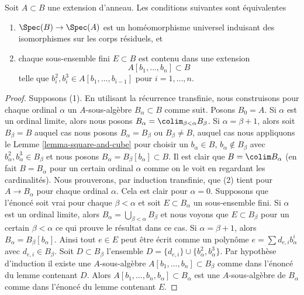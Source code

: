 \begin{proposition}
\label{proposition-universal-homeomorphism-equal-residue-fields}
Soit $A \subset B$ une extension d'anneau. Les conditions suivantes sont équivalentes
\begin{enumerate}
\item $\Spec(B) \to \Spec(A)$ est un homéomorphisme universel induisant des isomorphismes
sur les corps résiduels, et
\item chaque sous-ensemble fini $E \subset B$ est contenu dans une extension
$$
A[b_1, \ldots, b_n] \subset B
$$
telle que $b_i^2, b_i^3 \in A[b_1, \ldots, b_{i - 1}]$ pour $i = 1, \ldots, n$.
\end{enumerate}
\end{proposition}

\begin{proof}
Supposons (1). En utilisant la récurrence transfinie, nous construisons
pour chaque ordinal $\alpha$ un $A$-sous-algèbre $B_\alpha \subset B$
comme suit. Posons $B_0 = A$. Si $\alpha$ est un ordinal limite,
alors nous posons $B_\alpha = \colim_{\beta < \alpha} B_\beta$.
Si $\alpha = \beta + 1$, alors soit $B_\beta = B$ auquel cas nous
posons $B_\alpha = B_\beta$ ou $B_\beta \not = B$, auquel cas nous appliquons le Lemme
\ref{lemma-square-and-cube} pour choisir un $b_\alpha \in B$, $b_\alpha \not \in B_\beta$
avec $b_\alpha^2, b_\alpha^3 \in B_\beta$ et nous posons $B_\alpha = B_\beta[b_\alpha] \subset B$.
Il est clair que $B = \colim B_\alpha$ (en fait
$B = B_\alpha$ pour un certain ordinal $\alpha$ comme on
le voit en regardant les cardinalités). Nous prouverons,
par induction transfinie, que (2) tient pour
$A \to B_\alpha$ pour chaque ordinal $\alpha$. Cela est
clair pour $\alpha = 0$. Supposons que l'énoncé soit
vrai pour chaque $\beta < \alpha$ et soit $E \subset B_\alpha$
un sous-ensemble fini.
Si $\alpha$ est un ordinal limite, alors
$B_\alpha = \bigcup_{\beta < \alpha} B_\beta$ et nous voyons que $E \subset B_\beta$ pour
un certain $\beta < \alpha$ ce qui prouve le résultat
dans ce cas. Si $\alpha = \beta + 1$, alors $B_\alpha = B_\beta[b_\alpha]$.
Ainsi tout $e \in E$ peut être écrit comme
un polynôme $e = \sum d_{e, i}b_\alpha^i$ avec $d_{e, i} \in B_\beta$.
Soit $D \subset B_\beta$ l'ensemble $D = \{d_{e, i}\} \cup \{b_\alpha^2, b_\alpha^3\}$. Par hypothèse
d'induction
il existe une $A$-sous-algèbre $A[b_1, \ldots, b_n] \subset B_\beta$ comme dans
l'énoncé du lemme contenant $D$.
Alors $A[b_1, \ldots, b_n, b_\alpha] \subset B_\alpha$ est une $A$-sous-algèbre
de $B_\alpha$ comme dans l'énoncé du lemme
contenant $E$.


\end{proof}
